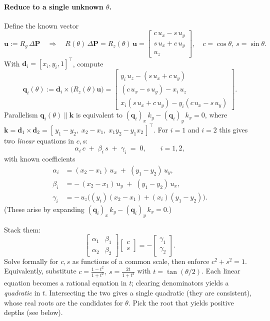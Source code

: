 \documentclass[12pt]{article}
\begin{document}
\paragraph{Reduce to a single unknown \(\theta\).}
Define the known vector
\[
\mathbf{u}:=R_g\,\Delta\mathbf{P} \quad\Rightarrow\quad
R(\theta)\,\Delta\mathbf{P}
=R_z(\theta)\,\mathbf{u}
=\begin{bmatrix}
c\,u_x - s\,u_y\\
s\,u_x + c\,u_y\\
u_z
\end{bmatrix},\quad c=\cos\theta,\ s=\sin\theta.
\]
With \(\mathbf{d}_i=[x_i,y_i,1]^\top\), compute
\[
\mathbf{q}_i(\theta):=\mathbf{d}_i\times\big(R_z(\theta)\mathbf{u}\big)
=
\begin{bmatrix}
y_i\,u_z - (s\,u_x + c\,u_y)\\[2pt]
(c\,u_x - s\,u_y) - x_i\,u_z\\[2pt]
x_i(s\,u_x + c\,u_y) - y_i(c\,u_x - s\,u_y)
\end{bmatrix}.
\]
Parallelism \(\mathbf{q}_i(\theta)\parallel \mathbf{k}\) is equivalent to
\((\mathbf{q}_i)_x\,k_y - (\mathbf{q}_i)_y\,k_x=0\), where
\(\mathbf{k}=\mathbf{d}_1\times\mathbf{d}_2=[\,y_1-y_2,\; x_2-x_1,\; x_1y_2-y_1x_2\,]^\top\).
For \(i=1\) and \(i=2\) this gives two \emph{linear} equations in \(c,s\):
\[
\alpha_i\,c \;+\; \beta_i\,s \;+\; \gamma_i \;=\; 0,\qquad i=1,2,
\]
with known coefficients
\[
\begin{aligned}
\alpha_i &= (x_2-x_1)\,u_x \;+\; (y_1-y_2)\,u_y,\\
\beta_i  &= -\,(x_2-x_1)\,u_y \;+\; (y_1-y_2)\,u_x,\\
\gamma_i &= -\,u_z\big((y_i)(x_2-x_1) + (x_i)(y_1-y_2)\big).
\end{aligned}
\]
(These arise by expanding \((\mathbf{q}_i)_x\,k_y - (\mathbf{q}_i)_y\,k_x=0\).)

Stack them:
\[
\begin{bmatrix}\alpha_1 & \beta_1\\ \alpha_2 & \beta_2\end{bmatrix}
\begin{bmatrix}c\\s\end{bmatrix}
= -\begin{bmatrix}\gamma_1\\\gamma_2\end{bmatrix}.
\]
Solve formally for \(c,s\) as functions of a common scale, then enforce \(c^2+s^2=1\).
Equivalently, substitute \(c=\tfrac{1-t^2}{1+t^2},\ s=\tfrac{2t}{1+t^2}\) with \(t=\tan(\theta/2)\).
Each linear equation becomes a rational equation in \(t\); clearing denominators yields a
\emph{quadratic} in \(t\). Intersecting the two gives a single quadratic (they are consistent),
whose real roots are the candidates for \(\theta\). Pick the root that yields positive
depths (see below).
\end{document}
